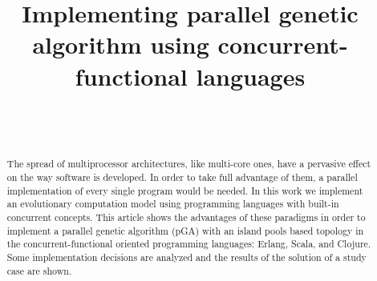 \documentclass[9pt, technote]{IEEEtran}
\begin{document}
\title{Implementing parallel genetic algorithm using concurrent-functional languages}


\author{\\
\\
}






\maketitle

\begin{abstract}
The spread of multiprocessor architectures, like multi-core ones, have a pervasive effect on the way software is developed. In order to take full advantage of them, a parallel implementation of every single program would be needed. In this work we implement an evolutionary computation model using programming languages with built-in concurrent concepts. This article shows the advantages of these paradigms in order to implement a  parallel genetic algorithm (pGA) with an island pools based topology in the concurrent-functional oriented programming languages: Erlang, Scala, and Clojure. Some implementation decisions are analyzed and the results of the solution of a study case are shown.
\end{abstract}
\end{document}
